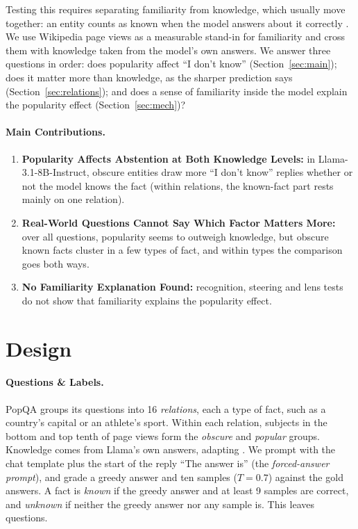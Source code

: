\documentclass[11pt]{article}
\newcommand{\idk}{``I don't know''}
\begin{document}
Testing this requires separating familiarity from knowledge, which usually move together: an entity counts as known when the model answers about it correctly \citep{ferrando2025iknow}. We use Wikipedia page views as a measurable stand-in for familiarity and cross them with knowledge taken from the model's own answers. We answer three questions in order: does popularity affect \idk{} (Section~\ref{sec:main}); does it matter more than knowledge, as the sharper prediction says (Section~\ref{sec:relations}); and does a sense of familiarity inside the model explain the popularity effect (Section~\ref{sec:mech})?

\paragraph{Main Contributions.}
\begin{enumerate}
\item \textbf{Popularity Affects Abstention at Both Knowledge Levels:} in Llama-3.1-8B-Instruct, obscure entities draw more \idk{} replies whether or not the model knows the fact (within relations, the known-fact part rests mainly on one relation).
\item \textbf{Real-World Questions Cannot Say Which Factor Matters More:} over all questions, popularity seems to outweigh knowledge, but obscure known facts cluster in a few types of fact, and within types the comparison goes both ways.
\item \textbf{No Familiarity Explanation Found:} recognition, steering and lens tests do not show that familiarity explains the popularity effect.
\end{enumerate}

\section{Design}
\label{sec:setup}

\paragraph{Questions \& Labels.} PopQA \citep{mallen2023popqa} groups its questions into 16 \emph{relations}, each a type of fact, such as a country's capital or an athlete's sport. Within each relation, subjects in the bottom and top tenth of page views form the \emph{obscure} and \emph{popular} groups. Knowledge comes from Llama's own answers, adapting \citet{gekhman2024slick}. We prompt with the chat template plus the start of the reply ``The answer is'' (the \emph{forced-answer prompt}), and grade a greedy answer and ten samples ($T=0.7$) against the gold answers. A fact is \emph{known} if the greedy answer and at least 9 samples are correct, and \emph{unknown} if neither the greedy answer nor any sample is. This leaves \faLlamaN{} questions.
\end{document}
